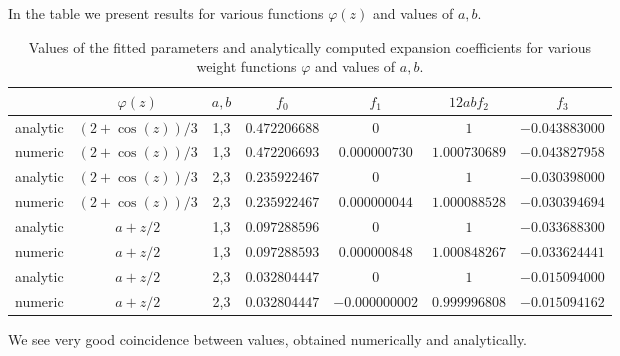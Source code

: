 \documentclass{article}
\begin{document}
In the table we present results for various functions $\varphi(z)$ and values of $a,b$.
\begin{table}[htpb]
\begin{center}
\begin{tabular}{c|cccccc}
  & $\varphi(z)$ & $a,b$ & $f_{0}$ &  $f_{1}$ &  $12ab f_{2}$ &  $f_{3}$ \\
 \hline
 analytic & $(2+\cos(z))/3$ & 1,3 & $0.472206688$ & $0$ & $1$&$-0.043883000$\\
 numeric & $(2+\cos(z))/3$ & 1,3 &  $0.472206693$ & $0.000000730$ & $1.000730689$&$-0.043827958$\\
  \hline
 analytic & $(2+\cos(z))/3$ & 2,3 & $0.235922467$ & $0$ & $1$&$-0.030398000$\\
 numeric & $(2+\cos(z))/3$ & 2,3 &  $0.235922467$ & $0.000000044$ & $1.000088528$&$-0.030394694$\\
\hline                                                
 analytic & $a+z/2$ & 1,3 & $0.097288596$ & $0$ & $1$&$-0.033688300$\\
 numeric & $a+z/2$ & 1,3 &  $0.097288593$ & $0.000000848$ & $1.000848267$&$-0.033624441$\\
\hline                                                
 analytic & $a+z/2$ & 2,3 & $0.032804447$ & $0$ & $1$&$-0.015094000$\\
 numeric & $a+z/2$ & 2,3 &  $0.032804447$ & $-0.000000002$ & $0.999996808$&$-0.015094162$\\
\end{tabular}
\caption{Values of the fitted parameters and analytically computed expansion coefficients for
  various weight functions $\varphi$ and values of $a,b$.
}
\label{tttt1}
\end{center}
\end{table}

We see very good coincidence between values, obtained numerically and analytically. 

\end{document}
